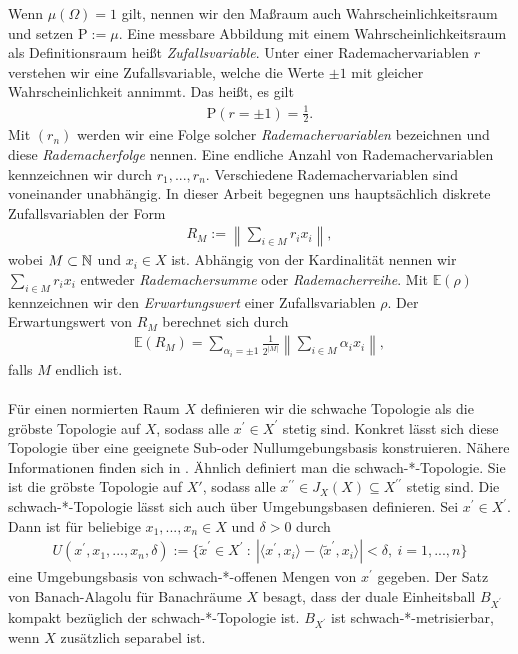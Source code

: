 Wenn $ \mu(\Omega) = 1 $ gilt, nennen wir den Maßraum auch Wahrscheinlichkeitsraum und setzen $ \mathrm{P} := \mu $.
Eine messbare Abbildung mit einem Wahrscheinlichkeitsraum als  Definitionsraum heißt \textit{Zufallsvariable}.
Unter einer Rademachervariablen $ r $ verstehen wir eine Zufallsvariable, welche die Werte $ \pm 1 $ mit gleicher Wahrscheinlichkeit annimmt.
Das heißt, es gilt 
\begin{align*}
		\mathrm{P}
	\left(
	r =  \pm 1
	\right)
	= \frac{1}{2}.
\end{align*}
Mit $ (r_n) $ werden wir eine Folge solcher \textit{Rademachervariablen} bezeichnen und diese \textit{Rademacherfolge} nennen. 
Eine endliche Anzahl von Rademachervariablen kennzeichnen wir durch $ r_1,...,r_n $.
Verschiedene Rademachervariablen sind voneinander unabhängig.
In dieser Arbeit begegnen uns hauptsächlich diskrete Zufallsvariablen der Form
\begin{align*}
	R_M := \left\| \sum \limits_{ i \in M} r_i x_i \right\|,
\end{align*}
wobei $ M \subset \mathbb{N} $ und $ x_i \in X $ ist. Abhängig von der Kardinalität nennen wir $ \sum_{ i \in M} r_i x_i $ entweder \textit{Rademachersumme} oder \textit{Rademacherreihe}.
Mit $ \mathbb{E}(\rho) $ kennzeichnen wir den \textit{Erwartungswert} einer Zufallsvariablen $ \rho. $
Der Erwartungswert von $ R_M $ berechnet sich durch
\begin{align*}
	\mathbb{E}(R_M)
	=
	\sum \limits_{\alpha_i = \pm 1} 
	\frac{1}{2^{|M|}}
	\left\| \sum \limits_{ i \in M} \alpha_i x_i \right\|,
\end{align*}
falls $ M $ endlich ist.\\
\\
Für einen normierten Raum $ X $ definieren wir die schwache Topologie als die gröbste Topologie auf $ X $, sodass alle $ x^\prime \in X^\prime $ stetig sind. 
Konkret lässt sich diese Topologie über eine geeignete Sub-oder Nullumgebungsbasis konstruieren. Nähere Informationen finden sich in \cite[Abschnitt 3.5]{Dobrowolski2010}.
Ähnlich definiert man die schwach-*-Topologie.
Sie ist die gröbste Topologie auf $ X' $, sodass alle $ x^{\prime \prime} \in J_X(X) \subseteq X^{\prime \prime} $ stetig sind.
Die schwach-*-Topologie lässt sich auch über Umgebungsbasen definieren.
Sei $ x^\prime \in X^\prime $. Dann ist für beliebige $ x_1,...,x_n \in X $ und $ \delta > 0 $ durch
\begin{align*}
	U(x^\prime , x_1,...,x_n, \delta)
	:=
	\{
	\tilde{x}^\prime \in X^\prime
	\ : \ 
	| \langle x^\prime ,x_i \rangle - \langle \tilde{x}^\prime, x_i \rangle | < \delta, \ i = 1,...,n
	\}
\end{align*}
eine Umgebungsbasis von schwach-*-offenen Mengen von $ x^\prime  $ gegeben.
Der Satz von Banach-Alagolu\cite[Chapter II]{Diestel1984} für Banachräume $ X $ besagt, dass der duale Einheitsball $ B_{X^\prime} $ kompakt bezüglich der schwach-*-Topologie ist.
$ B_{X^\prime} $ ist schwach-*-metrisierbar, wenn $ X $ zusätzlich separabel ist.


